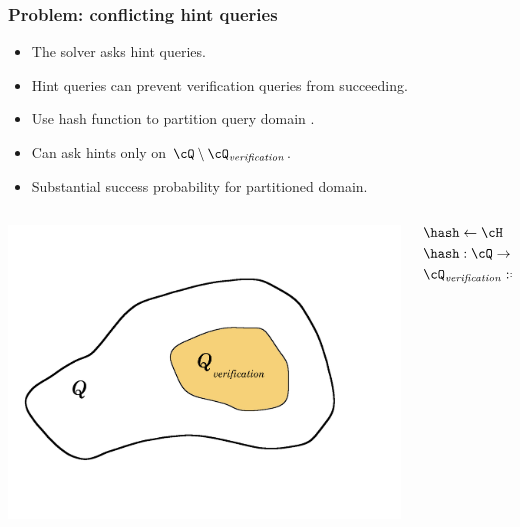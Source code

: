 \documentclass[first,firstsupp,handout,last]{ETHclass}
\begin{document}
\begin{frame}[t]
  \frametitle{Problem: conflicting hint queries}
  \begin{itemize}
    \item The solver asks hint queries.
    \item Hint queries can prevent verification queries from succeeding.
    \item Use hash function to partition query domain \cite{dodis2009security}.
    \item Can ask hints only on $\cQ \setminus \cQ_{\mathit{verification}}$.
    \item Substantial success probability for partitioned domain.
  \end{itemize}
  \begin{columns}
    \begin{column}{.4\textwidth}
      \includegraphics[scale=0.08]{images/hashSets.pdf}
    \end{column}
    \begin{column}{.4\textwidth}
      \begin{align*}
        &\hash \leftarrow \cH \\
        &\hash : \cQ \rightarrow \{0,1,\dots, 2(h+v) - 1\} \\
        &\cQ_{\mathit{verification}} := {q \in \cQ : hash(q) = 0}
      \end{align*}
    \end{column}
  \end{columns}
\end{frame}
\end{document}
